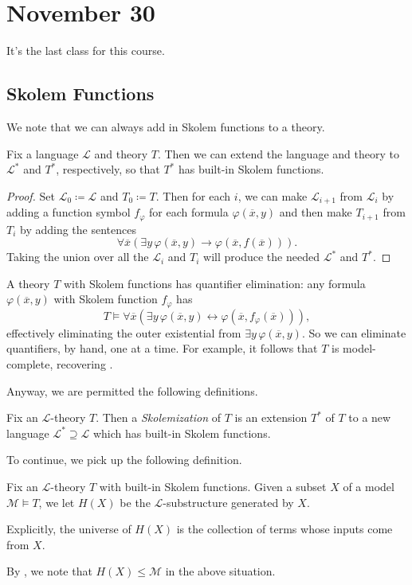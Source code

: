 \documentclass[../notes.tex]{subfiles}
\begin{document}
\section{November 30}

It's the last class for this course.

\subsection{Skolem Functions}
We note that we can always add in Skolem functions to a theory.
\begin{proposition}[Skolemization] \label{prop:skolemize}
	Fix a language $\mathcal L$ and theory $T$. Then we can extend the language and theory to $\mathcal L^*$ and $T^*$, respectively, so that $T^*$ has built-in Skolem functions.
\end{proposition}
\begin{proof}
	Set $\mathcal L_0\coloneqq\mathcal L$ and $T_0\coloneqq T$. Then for each $i$, we can make $\mathcal L_{i+1}$ from $\mathcal L_i$ by adding a function symbol $f_\varphi$ for each formula $\varphi(\overline x,y)$ and then make $T_{i+1}$ from $T_i$ by adding the sentences
	\[\forall\overline x(\exists y\,\varphi(\overline x,y)\to\varphi(\overline x,f(\overline x))).\]
	Taking the union over all the $\mathcal L_i$ and $T_i$ will produce the needed $\mathcal L^*$ and $T^*$.
\end{proof}
\begin{remark}
	A theory $T$ with Skolem functions has quantifier elimination: any formula $\varphi(\overline x,y)$ with Skolem function $f_\varphi$ has
	\[T\models\forall\overline x(\exists y\,\varphi(\overline x,y)\leftrightarrow\varphi(\overline x,f_\varphi(\overline x))),\]
	effectively eliminating the outer existential from $\exists y\,\varphi(\overline x,y)$. So we can eliminate quantifiers, by hand, one at a time. For example, it follows that $T$ is model-complete, recovering .
\end{remark}
Anyway, we are permitted the following definitions.
\begin{definition}[Skolemization]
	Fix an $\mathcal L$-theory $T$. Then a \textit{Skolemization} of $T$ is an extension $T^*$ of $T$ to a new language $\mathcal L^*\supseteq\mathcal L$ which has built-in Skolem functions.
\end{definition}
To continue, we pick up the following definition.
\begin{definition}
	Fix an $\mathcal L$-theory $T$ with built-in Skolem functions. Given a subset $X$ of a model $\mathcal M\models T$, we let $H(X)$ be the $\mathcal L$-substructure generated by $X$.
\end{definition}
\begin{remark}
	Explicitly, the universe of $H(X)$ is the collection of terms whose inputs come from $X$.
\end{remark}
\begin{remark}
	By , we note that $H(X)\le\mathcal M$ in the above situation.
\end{remark}
\end{document}
